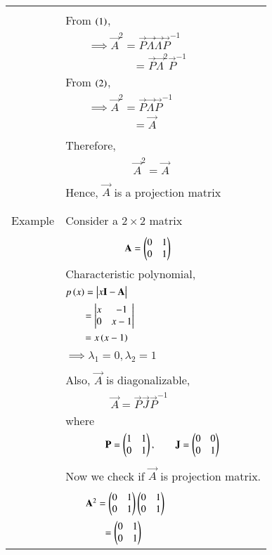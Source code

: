 \documentclass[journal,12pt]{IEEEtran}
\begin{document}
\begin{longtable}{|c|l|}
	&\\
	&From $\left(1\right)$,\\
	&$\qquad\implies \vec{A}^2=\vec{P}\vec{\Lambda}\vec{\Lambda}\vec{P}^{-1}$\\
	&$\qquad\qquad\qquad=\vec{P}\vec{\Lambda}^2\vec{P}^{-1}$\\
	&From $\left(2\right)$,\\
	&$\qquad\implies \vec{A}^2=\vec{P}\vec{\Lambda}\vec{P}^{-1}$\\
	&$\qquad\qquad\qquad=\vec{A}$\\
	&\\
	&Therefore,\\
	&$\qquad\qquad\qquad\vec{A}^2=\vec{A}$\\
	&\\
	& Hence, $\vec{A}$ is a projection matrix\\
	&\\
	\hline
	\multirow{3}{*}{Example} & \\
	& Consider a $2\times 2$ matrix\\
	&\\
	&$\qquad\qquad\qquad \mathbf{A}=\begin{pmatrix}0&1\\0&1\end{pmatrix}$\\
	& Characteristic polynomial,\\
	&$p\left(x\right)=\begin{vmatrix}x\mathbf{I}-\mathbf{A}\end{vmatrix}$\\
	&$\qquad =\begin{vmatrix}x&-1\\0&x-1\end{vmatrix}$\\
	&$\qquad =x\left(x-1\right)$\\
	&\\
	&$\implies\lambda_1=0,\lambda_2=1$\\
	&\\
	&Also, $\vec{A}$ is diagonalizable,\\
	&$\qquad\qquad \vec{A}=\vec{P}\vec{J}\vec{P}^{-1}$\\
	& where\\
	&$\qquad\qquad \mathbf{P}=\begin{pmatrix}1&1\\0&1\end{pmatrix},\qquad\mathbf{J}=\begin{pmatrix}0&0\\0&1\end{pmatrix}$\\
	&\\
	&Now we check if $\vec{A}$ is projection matrix.\\
	&\\
	&$\qquad \mathbf{A}^2=\begin{pmatrix}0&1\\0&1\end{pmatrix}\begin{pmatrix}0&1\\0&1\end{pmatrix}$\\
	&$\qquad\qquad = \begin{pmatrix}0&1\\0&1\end{pmatrix}$\\

\end{longtable}
\end{document}
